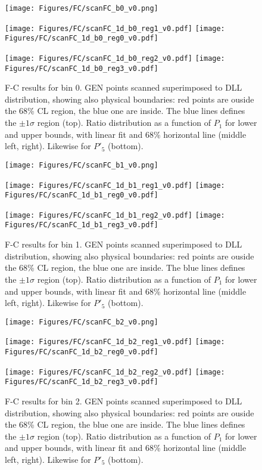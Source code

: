 \begin{figure}
  \centering
  \texttt{[image: Figures/FC/scanFC\_b0\_v0.png]}

  \texttt{[image: Figures/FC/scanFC\_1d\_b0\_reg1\_v0.pdf]}
  \texttt{[image: Figures/FC/scanFC\_1d\_b0\_reg0\_v0.pdf]}

  \texttt{[image: Figures/FC/scanFC\_1d\_b0\_reg2\_v0.pdf]}
  \texttt{[image: Figures/FC/scanFC\_1d\_b0\_reg3\_v0.pdf]}

  \caption{F-C results for bin 0.
    GEN points scanned superimposed to DLL distribution, showing also physical boundaries: red points are ouside the 68\% CL region, the blue one are inside.
    The blue lines defines the $\pm1\sigma$ region (top).
    Ratio distribution as a function of $P_1$ for lower and upper bounds, with linear fit and 68\% horizontal line (middle left, right).
    Likewise for $P'_5$ (bottom).}
  \label{fig:FC0}
\end{figure}

\begin{figure}
  \centering
  \texttt{[image: Figures/FC/scanFC\_b1\_v0.png]}

  \texttt{[image: Figures/FC/scanFC\_1d\_b1\_reg1\_v0.pdf]}
  \texttt{[image: Figures/FC/scanFC\_1d\_b1\_reg0\_v0.pdf]}

  \texttt{[image: Figures/FC/scanFC\_1d\_b1\_reg2\_v0.pdf]}
  \texttt{[image: Figures/FC/scanFC\_1d\_b1\_reg3\_v0.pdf]}

  \caption{F-C results for bin 1.
    GEN points scanned superimposed to DLL distribution, showing also physical boundaries: red points are ouside the 68\% CL region, the blue one are inside.
    The blue lines defines the $\pm1\sigma$ region (top).
    Ratio distribution as a function of $P_1$ for lower and upper bounds, with linear fit and 68\% horizontal line (middle left, right).
    Likewise for $P'_5$ (bottom).}
  \label{fig:FC1}
\end{figure}

\begin{figure}
  \centering
  \texttt{[image: Figures/FC/scanFC\_b2\_v0.png]}

  \texttt{[image: Figures/FC/scanFC\_1d\_b2\_reg1\_v0.pdf]}
  \texttt{[image: Figures/FC/scanFC\_1d\_b2\_reg0\_v0.pdf]}

  \texttt{[image: Figures/FC/scanFC\_1d\_b2\_reg2\_v0.pdf]}
  \texttt{[image: Figures/FC/scanFC\_1d\_b2\_reg3\_v0.pdf]}

  \caption{F-C results for bin 2.
    GEN points scanned superimposed to DLL distribution, showing also physical boundaries: red points are ouside the 68\% CL region, the blue one are inside.
    The blue lines defines the $\pm1\sigma$ region (top).
    Ratio distribution as a function of $P_1$ for lower and upper bounds, with linear fit and 68\% horizontal line (middle left, right).
    Likewise for $P'_5$ (bottom).}
  \label{fig:FC2}
\end{figure}

